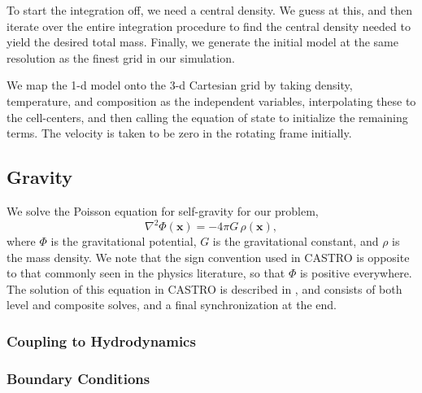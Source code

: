 \documentclass[12pt,preprint]{aastex}
\begin{document}
To start the integration off, we need a central density.  We guess at
this, and then iterate over the entire integration procedure to find
the central density needed to yield the desired total mass.  Finally,
we generate the initial model at the same resolution as the finest
grid in our simulation.

We map the 1-d model onto the 3-d Cartesian grid by taking density,
temperature, and composition as the independent variables,
interpolating these to the cell-centers, and then calling the equation
of state to initialize the remaining terms.  The velocity is taken to
be zero in the rotating frame initially.

\subsection{Gravity}
\label{sec:gravity}

We solve the Poisson equation for self-gravity for our problem,
\begin{equation}
  \nabla^2 \Phi(\mathbf{x}) = -4\pi G\, \rho(\mathbf{x}),
\end{equation}
where $\Phi$ is the gravitational potential, $G$ is the gravitational constant, and $\rho$ is the mass density. We note that the sign convention used in CASTRO is opposite to that commonly seen in the physics literature, so that $\Phi$ is positive everywhere. The solution of this equation in CASTRO is described in \cite{castro}, and consists of both level and composite solves, and a final synchronization at the end.

\subsubsection{Coupling to Hydrodynamics}\label{sec:gravity_hydro_coupling}

\subsubsection{Boundary Conditions}\label{sec:gravity_boundary_conditions}
\end{document}
